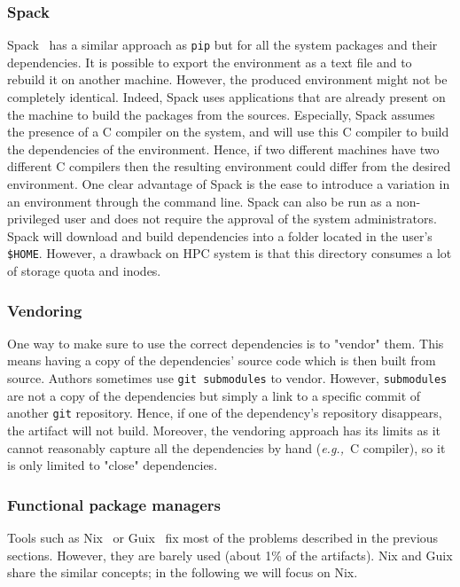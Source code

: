 \documentclass[sigconf,natbib=false]{acmart}
\newcommand{\eg}{\emph{e.g.,}}
\begin{document}
\subsubsection{Spack}

Spack\ \cite{gamblin_spack_2015} has a similar approach as \texttt{pip} but for all the system packages and their dependencies.
It is possible to export the environment as a text file and to rebuild it on another machine.
However, the produced environment might not be completely identical.
Indeed, Spack uses applications that are already present on the machine to build the packages from the sources.
Especially, Spack assumes the presence of a C compiler on the system, and will use this C compiler to build the dependencies of the environment.
Hence, if two different machines have two different C compilers then the resulting environment could differ from the desired environment.
One clear advantage of Spack is the ease to introduce a variation in an environment through the command line.
Spack can also be run as a non-privileged user and does not require the approval of the system administrators.
Spack will download and build dependencies into a folder located in the user's \texttt{\$HOME}.
However, a drawback on HPC system is that this directory consumes a lot of storage quota and inodes.

\subsubsection{Vendoring}

One way to make sure to use the correct dependencies is to "vendor" them.
This means having a copy of the dependencies' source code which is then built from source.
Authors sometimes use \texttt{git submodules} to vendor.
However, \texttt{submodules} are not a copy of the dependencies but simply a link to a specific commit of another \texttt{git} repository.
Hence, if one of the dependency's repository disappears, the artifact will not build.
Moreover, the vendoring approach has its limits as it cannot reasonably capture all the dependencies by hand (\eg\ C compiler), so it is only limited to "close" dependencies.

\subsubsection{Functional package managers}

Tools such as Nix\ \cite{dolstra_nix_2004} or Guix\ \cite{courtes_functional_2013} fix most of the problems described in the previous sections.
However, they are barely used (about 1\% of the artifacts).
Nix and Guix share the similar concepts; in the following we will focus on Nix.
\end{document}
